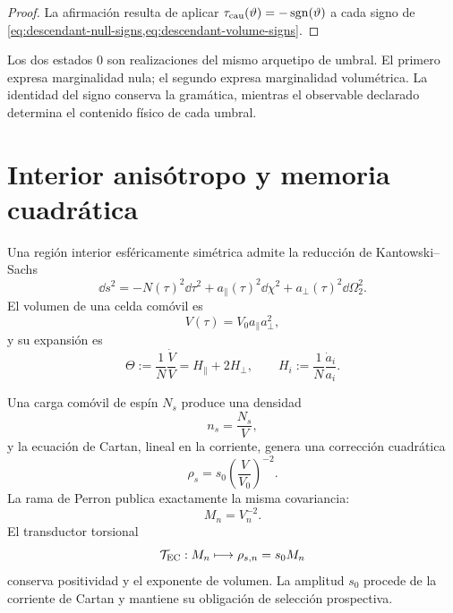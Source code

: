 \begin{proof}
La afirmaci\'on resulta de aplicar
\(\tau_{\rm cau}(\vartheta)=-\operatorname{sgn}(\vartheta)\) a cada signo de
\cref{eq:descendant-null-signs,eq:descendant-volume-signs}.
\end{proof}

Los dos estados \(0\) son realizaciones del mismo arquetipo de umbral. El
primero expresa marginalidad nula; el segundo expresa marginalidad
volum\'etrica. La identidad del signo conserva la gram\'atica, mientras el
observable declarado determina el contenido f\'isico de cada umbral.

\section{Interior anis\'otropo y memoria cuadr\'atica}

Una regi\'on interior esf\'ericamente sim\'etrica admite la reducci\'on de
Kantowski--Sachs
\begin{equation}
 \dd s^2=-N(\tau)^2\dd\tau^2
 +a_\parallel(\tau)^2\dd\chi^2
 +a_\perp(\tau)^2\dd\Omega_2^2.
 \label{eq:descendant-KS-metric}
\end{equation}
El volumen de una celda com\'ovil es
\begin{equation}
 V(\tau)=V_0a_\parallel a_\perp^2,
 \label{eq:descendant-KS-volume}
\end{equation}
y su expansi\'on es
\begin{equation}
 \Theta
 :=\frac1N\frac{\dot V}{V}
 =H_\parallel+2H_\perp,
 \qquad
 H_i:=\frac1N\frac{\dot a_i}{a_i}.
 \label{eq:descendant-KS-expansion}
\end{equation}

Una carga com\'ovil de esp\'in \(N_s\) produce una densidad
\begin{equation}
 n_s=\frac{N_s}{V},
 \label{eq:descendant-spin-number-density}
\end{equation}
y la ecuaci\'on de Cartan, lineal en la corriente, genera una correcci\'on
cuadr\'atica
\begin{equation}
 \rho_s=s_0\left(\frac V{V_0}\right)^{-2}.
 \label{eq:descendant-spin-density}
\end{equation}
La rama de Perron publica exactamente la misma covariancia:
\begin{equation}
 M_n=V_n^{-2}.
 \label{eq:descendant-Perron-volume}
\end{equation}
El transductor torsional
\begin{equation}
 \mathcal T_{\rm EC}:M_n\longmapsto
 \rho_{s,n}=s_0M_n
 \label{eq:descendant-EC-transducer}
\end{equation}
conserva positividad y el exponente de volumen. La amplitud \(s_0\) procede
de la corriente de Cartan y mantiene su obligaci\'on de selecci\'on
prospectiva.

